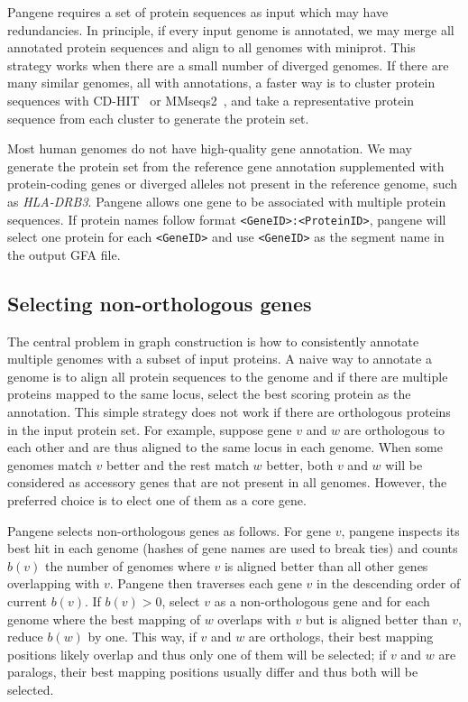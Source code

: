 \documentclass[webpdf,contemporary,large,namedate]{oup-authoring-template}%
\begin{document}
Pangene requires a set of protein sequences as input which may have redundancies.
In principle, if every input genome is annotated, we may merge all annotated protein sequences
and align to all genomes with miniprot.
This strategy works when there are a small number of diverged genomes.
If there are many similar genomes, all with annotations,
a faster way is to cluster protein sequences with CD-HIT~\citep{Li:2006aa} or MMseqs2~\citep{Schneider:2017aa},
and take a representative protein sequence from each cluster to generate the protein set.

Most human genomes do not have high-quality gene annotation.
We may generate the protein set from the reference gene annotation supplemented
with protein-coding genes or diverged alleles not present in the reference genome, such as \emph{HLA-DRB3}.
Pangene allows one gene to be associated with multiple protein sequences.
If protein names follow format {\tt <GeneID>:<ProteinID>},
pangene will select one protein for each {\tt <GeneID>} and use {\tt <GeneID>} as the segment name in the output GFA file.

\subsection{Selecting non-orthologous genes}

The central problem in graph construction is how to consistently annotate multiple genomes with a subset of input proteins.
A naive way to annotate a genome is to align all protein sequences to the genome
and if there are multiple proteins mapped to the same locus, select the best scoring protein as the annotation.
This simple strategy does not work if there are orthologous proteins in the input protein set.
For example, suppose gene $v$ and $w$ are orthologous to each other and are thus aligned to the same locus in each genome.
When some genomes match $v$ better and the rest match $w$ better,
both $v$ and $w$ will be considered as accessory genes that are not present in all genomes.
However, the preferred choice is to elect one of them as a core gene.

Pangene selects non-orthologous genes as follows.
For gene $v$, pangene inspects its best hit in each genome (hashes of gene names are used to break ties)
and counts $b(v)$ the number of genomes where $v$ is aligned better than all other genes overlapping with $v$.
Pangene then traverses each gene $v$ in the descending order of current $b(v)$.
If $b(v)>0$, select $v$ as a non-orthologous gene and for each genome where the best mapping of $w$ overlaps with $v$ but is aligned better than $v$, reduce $b(w)$ by one.
This way, if $v$ and $w$ are orthologs, their best mapping positions likely overlap and thus only one of them will be selected;
if $v$ and $w$ are paralogs, their best mapping positions usually differ and thus both will be selected.
\end{document}
